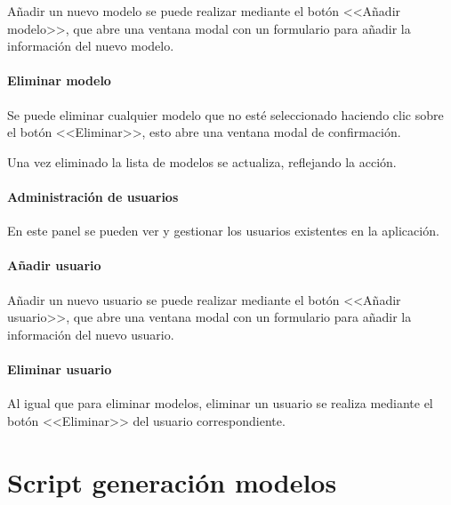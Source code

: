 Añadir un nuevo modelo se puede realizar mediante el botón <<Añadir modelo>>,
que abre una ventana modal con un formulario para añadir la información del
nuevo modelo.


\paragraph{Eliminar modelo}

Se puede eliminar cualquier modelo que no esté seleccionado haciendo clic sobre
el botón <<Eliminar>>, esto abre una ventana modal de confirmación.


Una vez eliminado la lista de modelos se actualiza, reflejando la acción.

\paragraph{Administración de usuarios}

En este panel se pueden ver y gestionar los usuarios existentes en la
aplicación.

\paragraph{Añadir usuario}

Añadir un nuevo usuario se puede realizar mediante el botón <<Añadir usuario>>,
que abre una ventana modal con un formulario para añadir la información del
nuevo usuario.


\paragraph{Eliminar usuario}

Al igual que para eliminar modelos, eliminar un usuario se realiza mediante el
botón <<Eliminar>> del usuario correspondiente.


\section{Script generación modelos}

